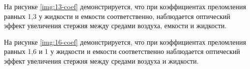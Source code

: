 На рисунке \ref{img:13-coef} демонстрируется, что при коэффициентах преломления равных 1,3 у жидкости и емкости соответственно, наблюдается оптический эффект увеличения стержня между средами воздуха, емкости и жидкости.

\begin{figure}[ht!]
\end{figure}
\FloatBarrier

На рисунке \ref{img:16-coef} демонстрируется, что при коэффициентах преломления равных 1,6 и 1 у жидкости и емкости соответственно наблюдается оптический эффект увеличения стержня между средами воздуха и жидкости.

\begin{figure}[ht!]
\end{figure}
\FloatBarrier


